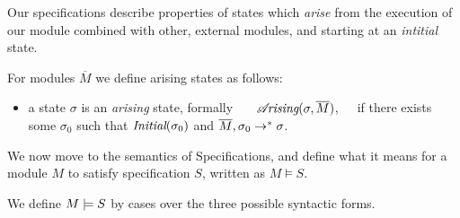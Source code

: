 {{Our specifications  describe  properties of states which \emph{arise} from the execution of our module combined with other, external modules, and
starting at an \emph{intitial} state. %


\begin{definition}
\label{def:arising}
For modules $\overline M$ we define arising  states as follows:

\begin{itemize}
\item
 a state $\sigma$ is 
{ an \emph{arising} state, formally \ \ \  $\mathcal{A}\!\textit{rising}(\sigma, \overline{M})$,\ \ \ if  there exists some $\sigma_0$ such that $\textit{Initial}(\sigma_0)$ and
$\overline{M}, {\sigma_0} \rightarrow^* {\sigma}$.}
\end{itemize}
\end{definition}
  
We now move to the semantics of \SpecLang Specifications, and   define what it means for  a module  $M$ to satisfy specification  $S$, written as $M \vDash S$.  
 
\begin{definition}%

We define $M \models {S}$ by cases over the three possible syntactic forms.

\label{def:necessity-semantics}


\end{definition}}}
